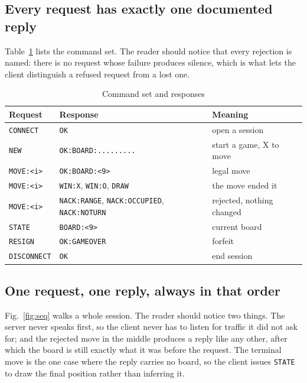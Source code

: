 \subsection{Every request has exactly one documented reply}
Table~\ref{tab:protocol} lists the command set. The reader should notice that
every rejection is named: there is no request whose failure produces silence,
which is what lets the client distinguish a refused request from a lost one.

\begin{table}[htbp]
\caption{Command set and responses}
\label{tab:protocol}
\centering
\footnotesize
\begin{tabular}{p{1.8cm}p{3.1cm}p{2.0cm}}
\hline
\textbf{Request} & \textbf{Response} & \textbf{Meaning} \\
\hline
\texttt{CONNECT} & \texttt{OK} & open a session \\
\texttt{NEW} & \texttt{OK:BOARD:.........} & start a game, X to move \\
\texttt{MOVE:<i>} & \texttt{OK:BOARD:<9>} & legal move \\
\texttt{MOVE:<i>} & \texttt{WIN:X}, \texttt{WIN:O}, \texttt{DRAW} & the move ended it \\
\texttt{MOVE:<i>} & \texttt{NACK:RANGE}, \texttt{NACK:OCCUPIED}, \texttt{NACK:NOTURN} & rejected, nothing changed \\
\texttt{STATE} & \texttt{BOARD:<9>} & current board \\
\texttt{RESIGN} & \texttt{OK:GAMEOVER} & forfeit \\
\texttt{DISCONNECT} & \texttt{OK} & end session \\
\hline
\end{tabular}
\end{table}

\subsection{One request, one reply, always in that order}
Fig.~\ref{fig:seq} walks a whole session. The reader should notice two things.
The server never speaks first, so the client never has to listen for traffic it
did not ask for; and the rejected move in the middle produces a reply like any
other, after which the board is still exactly what it was before the request.
The terminal move is the one case where the reply carries no board, so the
client issues \texttt{STATE} to draw the final position rather than inferring
it.

